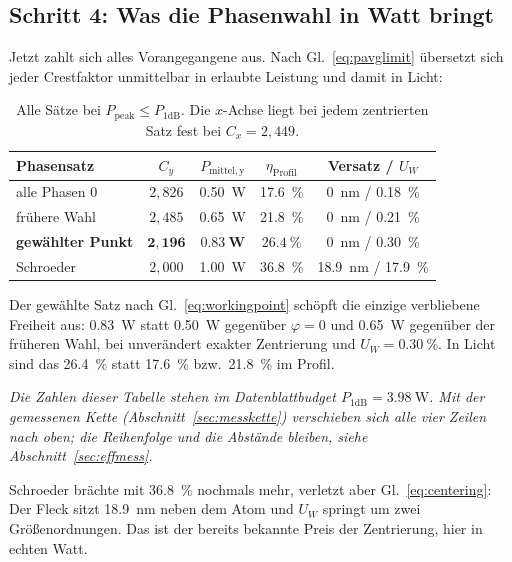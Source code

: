 \documentclass[11pt,a4paper]{article}
\newcommand{\crest}{\ensuremath{C}}
\newcommand{\Uw}{\ensuremath{U_W}}
\begin{document}
\subsection{Schritt 4: Was die Phasenwahl in Watt bringt}

Jetzt zahlt sich alles Vorangegangene aus. Nach Gl.~\eqref{eq:pavglimit}
übersetzt sich jeder Crestfaktor unmittelbar in erlaubte Leistung und damit in
Licht:

\begin{table}[htb]
  \centering
  \caption{Alle Sätze bei $P_\mathrm{peak}\le P_{1\mathrm{dB}}$. Die
  $x$-Achse liegt bei jedem zentrierten Satz fest bei $\crest_x=2{,}449$.}
  \label{tab:hardware}
  \begin{tabular}{lcccc}
    \toprule
    Phasensatz & $\crest_y$ & $P_\mathrm{mittel,y}$ & $\eta_\mathrm{Profil}$ & Versatz / $\Uw$\\
    \midrule
    alle Phasen $0$      & $2{,}826$ & \SI{0.50}{\watt} & \SI{17.6}{\percent} & \SI{0}{\nano\meter} / \SI{0.18}{\percent}\\
    frühere Wahl         & $2{,}485$ & \SI{0.65}{\watt} & \SI{21.8}{\percent} & \SI{0}{\nano\meter} / \SI{0.21}{\percent}\\
    \textbf{gewählter Punkt} & $\mathbf{2{,}196}$ & $\mathbf{\SI{0.83}{\watt}}$ & $\mathbf{\SI{26.4}{\percent}}$ & \SI{0}{\nano\meter} / \SI{0.30}{\percent}\\
    Schroeder            & $2{,}000$ & \SI{1.00}{\watt} & \SI{36.8}{\percent} & \SI{18.9}{\nano\meter} / \SI{17.9}{\percent}\\
    \bottomrule
  \end{tabular}
\end{table}

Der gewählte Satz nach Gl.~\eqref{eq:workingpoint} schöpft die einzige
verbliebene Freiheit aus: \SI{0.83}{\watt} statt \SI{0.50}{\watt} gegenüber
$\varphi=0$ und \SI{0.65}{\watt} gegenüber der früheren Wahl, bei unverändert
exakter Zentrierung und $\Uw=\SI{0.30}{\percent}$. In Licht sind das
\SI{26.4}{\percent} statt \SI{17.6}{\percent} bzw.\ \SI{21.8}{\percent} im
Profil.

\emph{Die Zahlen dieser Tabelle stehen im Datenblattbudget
$P_{1\mathrm{dB}}=\SI{3.98}{\watt}$. Mit der gemessenen Kette
(Abschnitt~\ref{sec:messkette}) verschieben sich alle vier Zeilen nach oben;
die Reihenfolge und die Abstände bleiben, siehe
Abschnitt~\ref{sec:effmess}.}

Schroeder brächte mit \SI{36.8}{\percent} nochmals mehr, verletzt aber
Gl.~\eqref{eq:centering}: Der Fleck sitzt \SI{18.9}{\nano\meter} neben dem
Atom und $\Uw$ springt um zwei Größenordnungen. Das ist der bereits bekannte
Preis der Zentrierung, hier in echten Watt.
\end{document}
